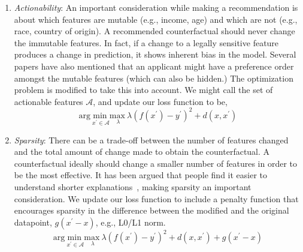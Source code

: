 \begin{enumerate}[leftmargin=*]
    \item \textit{Actionability}: An important consideration while making a recommendation is about which features are mutable (e.g., income, age) and which are not (e.g., race, country of origin).
    A recommended counterfactual should never change the immutable features. In fact, if a change to a legally sensitive feature produces a change in prediction, it shows inherent bias in the model. Several papers have also mentioned that an applicant might have a preference order amongst the mutable features (which can also be hidden.) The optimization problem is modified to take this into account. We might call the set of actionable features $\mathcal{A}$, and update our loss function to be,
    \begin{equation}
        {\mathrm{arg \ }}\underset{x^{\prime }\in \mathcal{A}}{\mathrm{min \ }}\underset{\lambda}{\mathrm{max \ }} \lambda(f(x^{\prime}) - y^{\prime})^2 + d(x, x^{\prime})
        \label{eq:cfe2}
    \end{equation}
    
    \item \textit{Sparsity}: There can be a trade-off between the number of features changed and the total amount of change made to obtain the counterfactual. A counterfactual ideally should change a smaller number of features in order to be the most effective. It has been argued that people find it easier to understand shorter explanations~\citep{Miller-xai:2019,naumann2021consequenceaware}, making sparsity an important consideration. We update our loss function to include a penalty function that encourages sparsity in the difference between the modified and the original datapoint, $g(x^{\prime} - x)$, e.g., L0/L1 norm.   
    \begin{equation}
        {\mathrm{arg \ }}\underset{x^{\prime }\in \mathcal{A}}{\mathrm{min \ }}\underset{\lambda}{\mathrm{max \ }} \lambda(f(x^{\prime}) - y^{\prime})^2 + d(x, x^{\prime}) + g(x^{\prime} - x)
        \label{eq:cfe3}
    \end{equation}
    

\end{enumerate}
